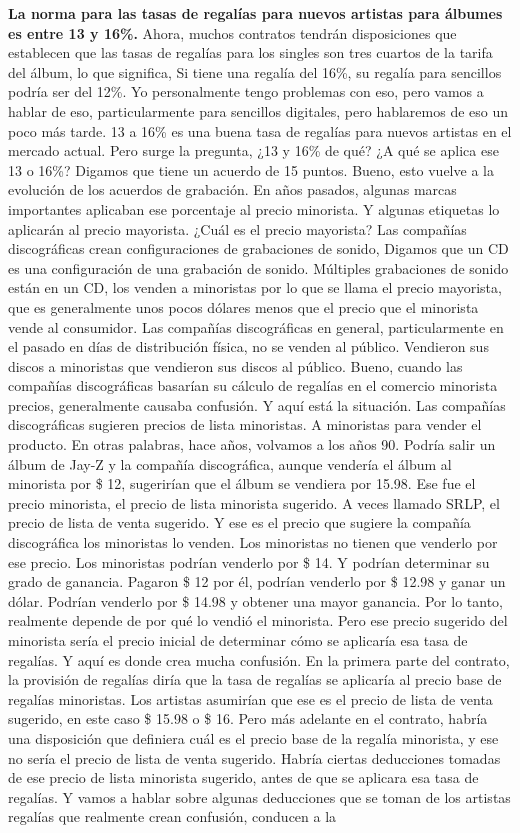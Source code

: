 \documentclass[10pt]{book}
\begin{document}
\textbf{La norma para las tasas de regalías para nuevos artistas para álbumes es entre 13 y 16\%.} Ahora, muchos contratos tendrán disposiciones que establecen que las tasas de regalías para los singles son tres cuartos de la tarifa del álbum, lo que significa, Si tiene una regalía del 16\%, su regalía para sencillos podría ser del 12\%. Yo personalmente tengo problemas con eso, pero vamos a hablar de eso, particularmente para sencillos digitales, pero hablaremos de eso un poco más tarde. 13 a 16\% es una buena tasa de regalías para nuevos artistas en el mercado actual. Pero surge la pregunta, ¿13 y 16\% de qué? ¿A qué se aplica ese 13 o 16\%? Digamos que tiene un acuerdo de 15 puntos. Bueno, esto vuelve a la evolución de los acuerdos de grabación. En años pasados, algunas marcas importantes aplicaban ese porcentaje al precio minorista. Y algunas etiquetas lo aplicarán al precio mayorista. ¿Cuál es el precio mayorista? Las compañías discográficas crean configuraciones de grabaciones de sonido, Digamos que un CD es una configuración de una grabación de sonido. Múltiples grabaciones de sonido están en un CD, los venden a minoristas por lo que se llama el precio mayorista, que es generalmente unos pocos dólares menos que el precio que el minorista vende al consumidor. Las compañías discográficas en general, particularmente en el pasado en días de distribución física, no se venden al público. Vendieron sus discos a minoristas que vendieron sus discos al público. Bueno, cuando las compañías discográficas basarían su cálculo de regalías en el comercio minorista precios, generalmente causaba confusión. Y aquí está la situación. Las compañías discográficas sugieren precios de lista minoristas. A minoristas para vender el producto. En otras palabras, hace años, volvamos a los años 90. Podría salir un álbum de Jay-Z y la compañía discográfica, aunque vendería el álbum al minorista por \$ 12, sugerirían que el álbum se vendiera por 15.98. Ese fue el precio minorista, el precio de lista minorista sugerido. A veces llamado SRLP, el precio de lista de venta sugerido. Y ese es el precio que sugiere la compañía discográfica los minoristas lo venden. Los minoristas no tienen que venderlo por ese precio. Los minoristas podrían venderlo por \$ 14. Y podrían determinar su grado de ganancia. Pagaron \$ 12 por él, podrían venderlo por \$ 12.98 y ganar un dólar. Podrían venderlo por \$ 14.98 y obtener una mayor ganancia. Por lo tanto, realmente depende de por qué lo vendió el minorista. Pero ese precio sugerido del minorista sería el precio inicial de determinar cómo se aplicaría esa tasa de regalías. Y aquí es donde crea mucha confusión. En la primera parte del contrato, la provisión de regalías diría que la tasa de regalías se aplicaría al precio base de regalías minoristas. Los artistas asumirían que ese es el precio de lista de venta sugerido, en este caso \$ 15.98 o \$ 16. Pero más adelante en el contrato, habría una disposición que definiera cuál es el precio base de la regalía minorista, y ese no sería el precio de lista de venta sugerido. Habría ciertas deducciones tomadas de ese precio de lista minorista sugerido, antes de que se aplicara esa tasa de regalías. Y vamos a hablar sobre algunas deducciones que se toman de los artistas regalías que realmente crean confusión, conducen a la 
\end{document}
